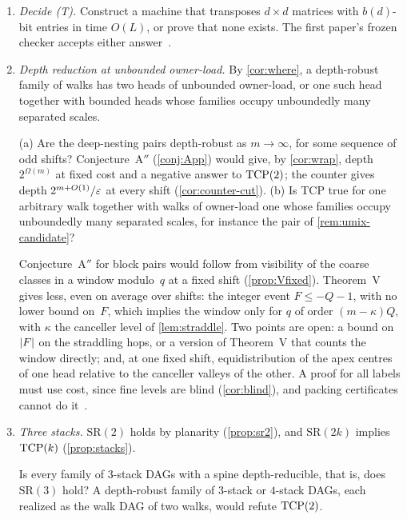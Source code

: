 \begin{enumerate}[label=\arabic*.,leftmargin=2em]
\item \emph{Decide (T).} Construct a machine that transposes $d\times d$ matrices with $b(d)$-bit entries in time $O(L)$, or prove
that none exists. The first paper's frozen checker accepts either answer~\cite{FirstPaper2026}.

\item \emph{Depth reduction at unbounded owner-load.} By \cref{cor:where}, a depth-robust family of walks has two heads of
unbounded owner-load, or one such head together with bounded heads whose families occupy unboundedly many separated scales.
\begin{problem}\label{prob:tcp-cases}
(a) Are the deep-nesting pairs depth-robust as $m\to\infty$, for some sequence of odd shifts? Conjecture~A$''$ (\cref{conj:App})
would give, by \cref{cor:wrap}, depth $2^{\Omega(m)}$ at fixed cost and a negative answer to $\mathrm{TCP}(2)$; the counter gives
depth $2^{m+O(1)}/\varepsilon$ at every shift (\cref{cor:counter-cut}). (b) Is TCP true for one arbitrary walk together with walks of
owner-load one whose families occupy unboundedly many separated scales, for instance the pair of \cref{rem:umix-candidate}?
\end{problem}
Conjecture~A$''$ for block pairs would follow from visibility of the coarse classes in a window modulo~$q$ at a fixed shift
(\cref{prop:Vfixed}). Theorem~V gives less, even on average over shifts: the integer event $F\le-Q-1$, with no lower bound
on~$F$, which implies the window only for $q$ of order $(m-\kappa)Q$, with $\kappa$ the canceller level of \cref{lem:straddle}. Two points are open: a bound on $\lvert F \rvert$ on the
straddling hops, or a version of Theorem~V that counts the window directly; and, at one fixed shift, equidistribution of the apex
centres of one head relative to the canceller valleys of the other. A proof for all labels must use cost, since fine levels are blind (\cref{cor:blind}), and
packing certificates cannot do it~\cite[Proposition~5.14]{FourthPaper2026}.

\item \emph{Three stacks.} $\mathrm{SR}(2)$ holds by planarity (\cref{prop:sr2}), and $\mathrm{SR}(2k)$ implies $\mathrm{TCP}(k)$
(\cref{prop:stacks}).
\begin{problem}\label{prob:sr3}
Is every family of $3$-stack DAGs with a spine depth-reducible, that is, does $\mathrm{SR}(3)$ hold? A depth-robust family of
$3$-stack or $4$-stack DAGs, each realized as the walk DAG of two walks, would refute $\mathrm{TCP}(2)$.
\end{problem}


\end{enumerate}
